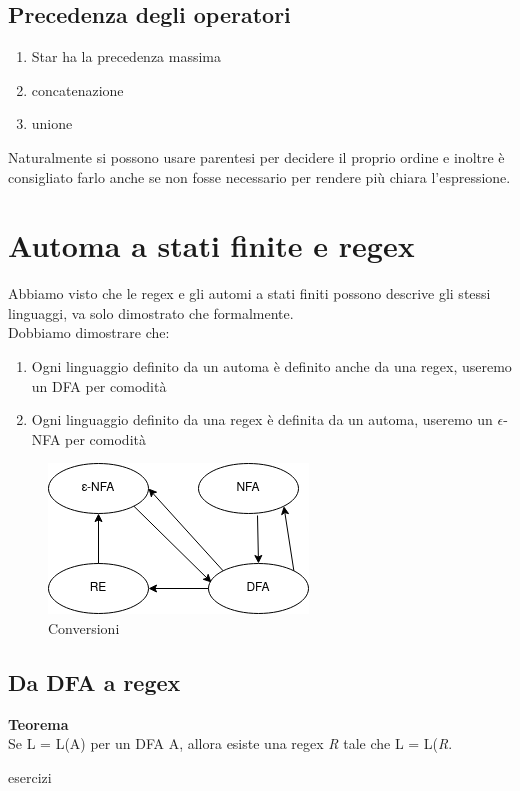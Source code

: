 \documentclass[12pt]{article}
\begin{document}
\subsection{Precedenza degli operatori}
\begin{enumerate}
  \item Star ha la precedenza massima
  \item concatenazione
  \item unione
\end{enumerate}
Naturalmente si possono usare parentesi per decidere il proprio ordine e inoltre è consigliato farlo anche se non fosse necessario per rendere più chiara l'espressione.

\section{Automa a stati finite e regex}
Abbiamo visto che le regex e gli automi a stati finiti possono descrive gli stessi linguaggi, va solo dimostrato che formalmente. 
\\ Dobbiamo dimostrare che:
\begin{enumerate}
  \item Ogni linguaggio definito da un automa è definito anche da una regex, useremo un DFA per comodità 
  \item Ogni linguaggio definito da una regex è definita da un automa, useremo un $\epsilon$-NFA per comodità
\end{enumerate}

\begin{figure}[h]
\includegraphics[scale = 0.7]{media/regex_conv.png}
\centering
\caption{Conversioni}
\end{figure}

\subsection{Da DFA a regex}
\textbf{Teorema} 
\\ Se L = L(A) per un DFA A, allora esiste una regex \emph{R} tale che L = L(\emph{R}. 



\newpage
{esercizi}
\end{document}
